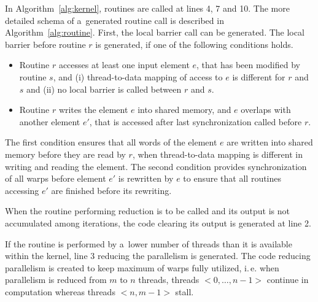 \documentclass[final]{siamltex}
\def\ie{i.\,e.}
\begin{document}
{In Algorithm~\ref{alg:kernel}, routines are called at lines 4, 7 and 10. The more detailed schema of a~generated routine call is described in Algorithm~\ref{alg:routine}. First, the local barrier call can be generated. The local barrier before routine $r$ is generated, if one of the following conditions holds.
\begin{itemize}
\item Routine $r$ accesses at least one input element $e$, that has been modified by routine $s$, and (i) thread-to-data mapping of access to $e$ is different for $r$ and $s$ and (ii) no local barrier is called between $r$ and $s$.
        \item Routine $r$ writes the element $e$ into shared memory, and $e$ overlaps with another element $e'$, that is accessed after last synchronization called before $r$.
\end{itemize}

The first condition ensures that all words of the element $e$ are written into shared memory before they are read by $r$, when thread-to-data mapping is different in writing and reading the element. The second condition provides synchronization of all warps before element $e'$ is rewritten by $e$ to ensure that all routines accessing $e'$ are finished before its rewriting.



When the routine performing reduction is to be called and its output is not accumulated among iterations, the code clearing its output is generated at line 2.

If the routine is performed by a~lower number of threads than it is available within the kernel, line 3 reducing the parallelism is generated. The code reducing parallelism is created to keep maximum of warps fully utilized, \ie{} when parallelism is reduced from $m$ to $n$ threads, threads $<0, \dotsc, n-1>$ continue in computation whereas threads $<n, m-1>$ stall.

}
\end{document}
